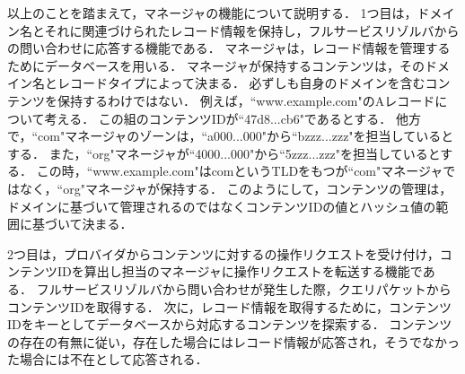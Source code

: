 以上のことを踏まえて，マネージャの機能について説明する．
1つ目は，ドメイン名とそれに関連づけられたレコード情報を保持し，フルサービスリゾルバからの問い合わせに応答する機能である．
マネージャは，レコード情報を管理するためにデータベースを用いる．
マネージャが保持するコンテンツは，そのドメイン名とレコードタイプによって決まる．
必ずしも自身のドメインを含むコンテンツを保持するわけではない．
例えば，``www.example.com"のAレコードについて考える．
この組のコンテンツIDが``47d8...cb6"であるとする．
他方で，``com"マネージャのゾーンは，``a000...000"から``bzzz...zzz"を担当しているとする．
また，``org"マネージャが``4000...000"から``5zzz...zzz"を担当しているとする．
この時，``www.example.com"はcomというTLDをもつが``com"マネージャではなく，``org"マネージャが保持する．
このようにして，コンテンツの管理は，ドメインに基づいて管理されるのではなくコンテンツIDの値とハッシュ値の範囲に基づいて決まる．
%
%

2つ目は，プロバイダからコンテンツに対するの操作リクエストを受け付け，コンテンツIDを算出し担当のマネージャに操作リクエストを転送する機能である．
フルサービスリゾルバから問い合わせが発生した際，クエリパケットからコンテンツIDを取得する．
次に，レコード情報を取得するために，コンテンツIDをキーとしてデータベースから対応するコンテンツを探索する．
コンテンツの存在の有無に従い，存在した場合にはレコード情報が応答され，そうでなかった場合には不在として応答される．
%


